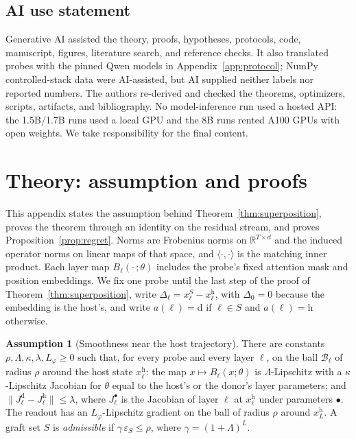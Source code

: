 \documentclass{article}
\theoremstyle{plain}
\theoremstyle{definition}
\newtheorem{assumption}{Assumption}
\theoremstyle{remark}
\newcommand{\host}{\mathrm{h}}
\newcommand{\donor}{\mathrm{d}}
\newcommand{\Rb}{\mathbb{R}}
\begin{document}
\subsection*{AI use statement}
\label{sec:ai-use}
Generative AI assisted the theory, proofs, hypotheses, protocols, code,
manuscript, figures, literature search, and reference checks.
It also translated probes with the pinned Qwen models in
Appendix~\ref{app:protocol}; NumPy controlled-stack data were AI-assisted, but
AI supplied neither labels nor reported numbers. The authors re-derived and
checked the theorems, optimizers, scripts, artifacts, and bibliography. No model-inference run
used a hosted API: the 1.5B/1.7B runs used a local GPU and the 8B runs rented
A100 GPUs with open weights. We take responsibility for the final content.




\newpage
\appendix

\section{Theory: assumption and proofs}
\label{app:proof-superposition}

This appendix states the assumption behind Theorem~\ref{thm:superposition},
proves the theorem through an identity on the residual stream, and proves
Proposition~\ref{prop:regret}. Norms are Frobenius norms on $\Rb^{T\times d}$
and the induced operator norms on linear maps of that space, and
$\langle\cdot,\cdot\rangle$ is the matching inner product. Each layer map
$B_\ell(\cdot\,;\theta)$ includes the probe's fixed attention mask and position
embeddings. We fix one probe until the last step of the proof of
Theorem~\ref{thm:superposition}, write $\Delta_\ell=x^{S}_\ell-x^{\host}_\ell$,
with $\Delta_0=0$ because the embedding is the host's, and write
$a(\ell)=\donor$ if $\ell\in S$ and $a(\ell)=\host$ otherwise.

\begin{assumption}[Smoothness near the host trajectory]
\label{ass:smooth}
There are constants $\rho,\Lambda,\kappa,\lambda,L_\varphi\ge0$ such that, for
every probe and every layer $\ell$, on the ball $\mathcal{B}_\ell$ of radius
$\rho$ around the host state $x^{\host}_\ell$: the map $x\mapsto B_\ell(x;\theta)$
is $\Lambda$-Lipschitz with a $\kappa$-Lipschitz Jacobian for $\theta$ equal to
the host's or the donor's layer parameters; and
$\|J^{\donor}_\ell-J^{\host}_\ell\|\le\lambda$, where $J^{\bullet}_\ell$ is the
Jacobian of layer $\ell$ at $x^{\host}_\ell$ under parameters $\bullet$. The
readout has an $L_\varphi$-Lipschitz gradient on the ball of radius $\rho$ around
$x^{\host}_L$. A graft set $S$ is \emph{admissible} if
$\gamma\,\varepsilon_S\le\rho$, where $\gamma=(1+\Lambda)^{L}$.
\end{assumption}
\end{document}

